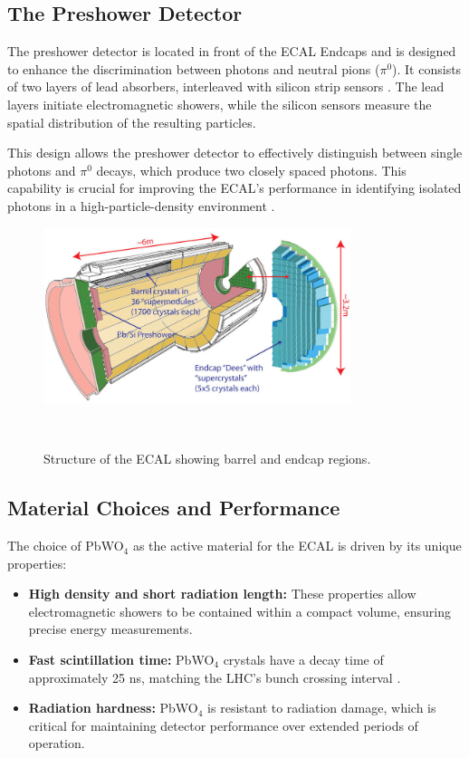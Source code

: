 \subsection{The Preshower Detector}
The preshower detector is located in front of the ECAL Endcaps and is designed to enhance the discrimination between photons and neutral pions ($\pi^0$). It consists of two layers of lead absorbers, interleaved with silicon strip sensors \cite{ecal_tdr_preshower}. The lead layers initiate electromagnetic showers, while the silicon sensors measure the spatial distribution of the resulting particles.

This design allows the preshower detector to effectively distinguish between single photons and $\pi^0$ decays, which produce two closely spaced photons. This capability is crucial for improving the ECAL's performance in identifying isolated photons in a high-particle-density environment \cite{ecal_tdr_preshower}.

\begin{figure}[ht]
    \centering
    \includegraphics[width=0.8\textwidth]{Figures/ECAL Schematic Overview.png} %
    \caption{Structure of the ECAL showing barrel and endcap regions.} ~\cite{ECAL}
    \label{fig:ecal}
\end{figure}

\subsection{Material Choices and Performance}
The choice of PbWO$_4$ as the active material for the ECAL is driven by its unique properties:
\begin{itemize}
    \item \textbf{High density and short radiation length:} These properties allow electromagnetic showers to be contained within a compact volume, ensuring precise energy measurements.
    \item \textbf{Fast scintillation time:} PbWO$_4$ crystals have a decay time of approximately 25 ns, matching the LHC's bunch crossing interval \cite{ecal_tdr}.
    \item \textbf{Radiation hardness:} PbWO$_4$ is resistant to radiation damage, which is critical for maintaining detector performance over extended periods of operation.
\end{itemize}

